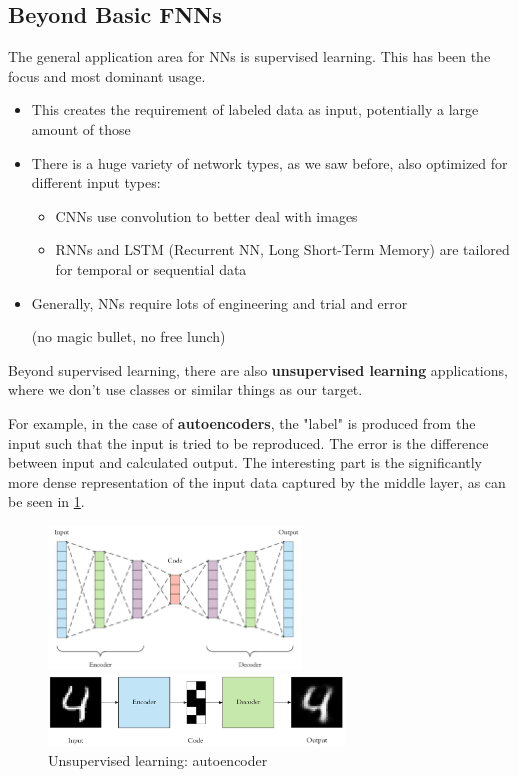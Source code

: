 \subsection{Beyond Basic FNNs}

The general application area for NNs is supervised learning. This has been the focus and most dominant usage.
\begin{itemize}
  \item This creates the requirement of labeled data as input, potentially a large amount of those
  \item There is a huge variety of network types, as we saw before, also optimized for different input types:
  \begin{itemize}
    \item CNNs use convolution to better deal with images
    \item RNNs and LSTM (Recurrent NN, Long Short-Term Memory) are tailored for temporal or sequential data
  \end{itemize}
  \item Generally, NNs require lots of engineering and trial and error \begin{note}(no magic bullet, no free lunch)\end{note}
\end{itemize}

Beyond supervised learning, there are also \textbf{unsupervised learning} applications, where we don't use classes or similar things as our target.

For example, in the case of \textbf{autoencoders}, the "label" is produced from the input such that the input is tried to be reproduced. The error is the difference between input and calculated output. The interesting part is the significantly more dense representation of the input data captured by the middle layer, as can be seen in \ref{fig:6_bb_autoencoder}.

\begin{figure}[H]
  \centering
  \includegraphics[width=0.6\textwidth]{assets/nn/in__auto_arch.png}

  \vspace*{0.5cm}
  \includegraphics[width=0.7\textwidth]{assets/nn/in__auto_code.png}
  
  \caption{Unsupervised learning: autoencoder}
  \label{fig:6_bb_autoencoder}
\end{figure}

